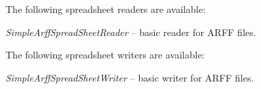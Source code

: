 \documentclass[a4paper]{book}
\begin{document}
The following spreadsheet readers are available:
\begin{tight_itemize}
  \item \textit{SimpleArffSpreadSheetReader} -- basic reader for ARFF files.
\end{tight_itemize}

The following spreadsheet writers are available:
\begin{tight_itemize}
  \item \textit{SimpleArffSpreadSheetWriter} -- basic writer for ARFF files.
\end{tight_itemize}



\end{document}
